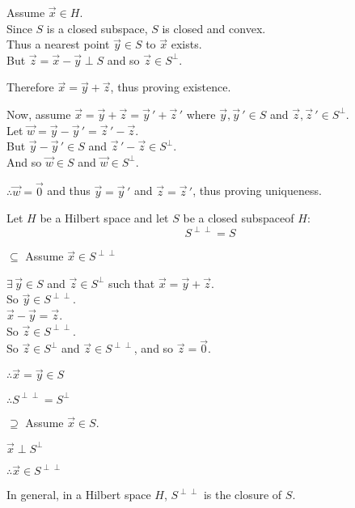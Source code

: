 \documentclass[letterpaper,12pt,fleqn]{article}
\newcommand{\vw}{\vec{w}}
\newcommand{\vx}{\vec{x}}
\newcommand{\vy}{\vec{y}}
\newcommand{\vyp}{\vec{y}\,'}
\newcommand{\vz}{\vec{z}}
\newcommand{\vzp}{\vec{z}\,'}
\newcommand{\vo}{\vec{0}}
\newcommand{\Sp}{S^{\perp}}
\newcommand{\Spp}{S^{\perp\perp}}
\begin{document}
\begin{theproof}
  Assume $\vx\in H$. \\
  Since $S$ is a closed subspace, $S$ is closed and convex. \\
  Thus a nearest point $\vy\in S$ to $\vx$ exists. \\
  But $\vz=\vx-\vy\perp S$ and so $\vz\in\Sp$.

  Therefore $\vx=\vy+\vz$, thus proving existence.

  Now, assume $\vx=\vy+\vz=\vyp+\vzp$ where $\vy,\vyp\in S$ and
  $\vz,\vzp\in\Sp$. \\
  Let $\vw=\vy-\vyp=\vzp-\vz$. \\
  But $\vy-\vyp\in S$ and $\vzp-\vz\in\Sp$. \\
  And so $\vw\in S$ and $\vw\in\Sp$.

  $\therefore\vw=\vo$ and thus $\vy=\vyp$ and $\vz=\vzp$, thus proving
  uniqueness.
\end{theproof}

\begin{theorem}
  Let $H$ be a Hilbert space and let $S$ be a closed subspaceof $H$:
  \[\Spp=S\]
\end{theorem}

\begin{theproof}
  \listbreak
  \begin{description}
  \item $\subseteq$ Assume $\vx\in\Spp$

    $\exists\,\vy\in S$ and $\vz\in\Sp$ such that $\vx=\vy+\vz$. \\
    So $\vy\in\Spp$. \\
    $\vx-\vy=\vz$. \\
    So $\vz\in\Spp$. \\
    So $\vz\in\Sp$ and $\vz\in\Spp$, and so $\vz=\vo$.

    $\therefore\vx=\vy\in S$

    $\therefore\Spp=\Sp$

  \item $\supseteq$ Assume $\vx\in S$.

    $\vx\perp\Sp$

    $\therefore\vx\in\Spp$
  \end{description}
\end{theproof}

In general, in a Hilbert space $H$, $\Spp$ is the closure of $S$.
\end{document}
